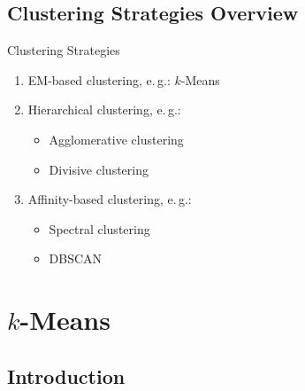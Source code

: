 \subsection{Clustering Strategies Overview}

\begin{frame}{Clustering Strategies}{}
	\begin{enumerate}
		\item EM-based clustering, e.\,g.: $k$-Means
		\item Hierarchical clustering, e.\,g.:
		\begin{itemize}
			\item Agglomerative clustering
			\item Divisive clustering
		\end{itemize}
		\item Affinity-based clustering, e.\,g.:
		\begin{itemize}
			\item Spectral clustering
			\item DBSCAN
		\end{itemize}
	\end{enumerate}
\end{frame}


\section{$k$-Means}

\subsection{Introduction}

